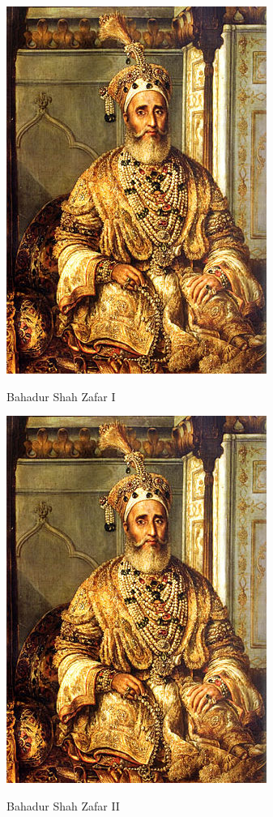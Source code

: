 \begin{marginfigure}[-5.5in]
    \centering
    \includegraphics[width=0.75\marginparwidth]{./pictures/Bahadur_Shah_II.jpg}
    \caption{Bahadur Shah Zafar I}
    \vspace{0.8in}
    \includegraphics[width=0.75\marginparwidth]{./pictures/Bahadur_Shah_II.jpg}
    \caption{Bahadur Shah Zafar II}
    \vspace{0.8in}

\end{marginfigure}
